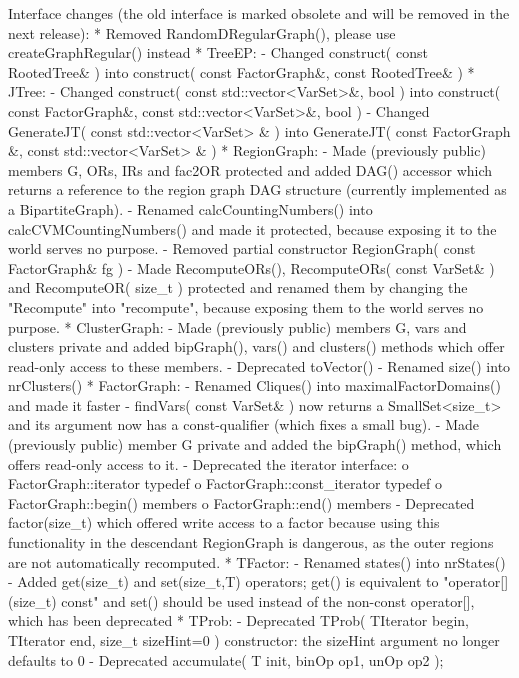 \begin{DoxyVerbInclude}
Interface changes (the old interface is marked obsolete and will be removed in the next release):
* Removed RandomDRegularGraph(), please use createGraphRegular() instead
* TreeEP:
  - Changed construct( const RootedTree& ) into
    construct( const FactorGraph&, const RootedTree& )
* JTree:
  - Changed construct( const std::vector<VarSet>&, bool ) into
    construct( const FactorGraph&, const std::vector<VarSet>&, bool )
  - Changed GenerateJT( const std::vector<VarSet> & )
    into GenerateJT( const FactorGraph &, const std::vector<VarSet> & )
* RegionGraph: 
  - Made (previously public) members G, ORs, IRs and fac2OR protected and
    added DAG() accessor which returns a reference to the region graph DAG 
    structure (currently implemented as a BipartiteGraph).
  - Renamed calcCountingNumbers() into calcCVMCountingNumbers() and made it 
    protected, because exposing it to the world serves no purpose.
  - Removed partial constructor RegionGraph( const FactorGraph& fg )
  - Made RecomputeORs(), RecomputeORs( const VarSet& ) and RecomputeOR( size_t ) 
    protected and renamed them by changing the "Recompute" into "recompute", 
    because exposing them to the world serves no purpose.
* ClusterGraph:
  - Made (previously public) members G, vars and clusters private and added 
    bipGraph(), vars() and clusters() methods which offer read-only access 
    to these members.
  - Deprecated toVector()
  - Renamed size() into nrClusters()
* FactorGraph:
  - Renamed Cliques() into maximalFactorDomains() and made it faster
  - findVars( const VarSet& ) now returns a SmallSet<size_t>
    and its argument now has a const-qualifier (which fixes a small bug).
  - Made (previously public) member G private and added the 
    bipGraph() method, which offers read-only access to it.
  - Deprecated the iterator interface:
    o FactorGraph::iterator typedef
    o FactorGraph::const_iterator typedef
    o FactorGraph::begin() members
    o FactorGraph::end() members
  - Deprecated factor(size_t) which offered write access to a factor
    because using this functionality in the descendant RegionGraph is dangerous,
    as the outer regions are not automatically recomputed.
* TFactor:
  - Renamed states() into nrStates()
  - Added get(size_t) and set(size_t,T) operators; 
    get() is equivalent to "operator[](size_t) const" and set() should
    be used instead of the non-const operator[], which has been deprecated
* TProb:
  - Deprecated TProb( TIterator begin, TIterator end, size_t sizeHint=0 )
    constructor: the sizeHint argument no longer defaults to 0
  - Deprecated accumulate( T init, binOp op1, unOp op2 );

\end{DoxyVerbInclude}

